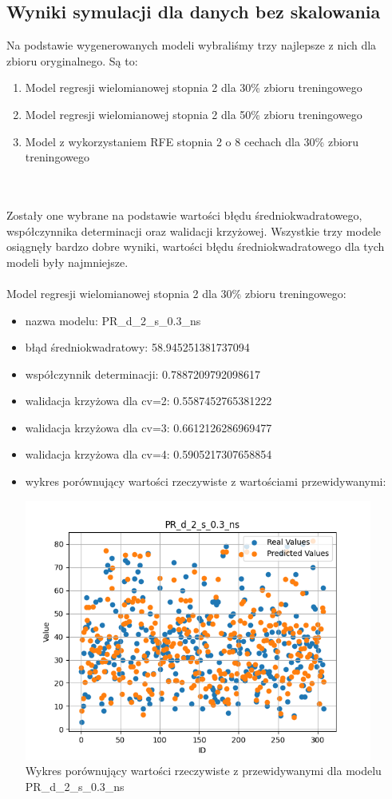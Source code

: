 \documentclass[11pt, a4paper, notitlepage]{report}
\begin{document}
\subsection{Wyniki symulacji dla danych bez skalowania}
Na podstawie wygenerowanych modeli wybraliśmy trzy najlepsze z nich dla zbioru oryginalnego. Są to:
\begin{enumerate}
	\item Model regresji wielomianowej stopnia 2 dla 30\% zbioru treningowego
	\item Model regresji wielomianowej stopnia 2 dla 50\% zbioru treningowego
	\item Model z wykorzystaniem RFE stopnia 2 o 8 cechach dla 30\% zbioru treningowego
\end{enumerate}
\\ \\
Zostały one wybrane na podstawie wartości błędu średniokwadratowego, współczynnika determinacji oraz walidacji krzyżowej. Wszystkie trzy modele osiągnęły bardzo dobre wyniki, wartości błędu średniokwadratowego  dla tych modeli były najmniejsze.
\\ \\
Model regresji wielomianowej stopnia 2 dla 30\% zbioru treningowego:
\begin{itemize}
	\item nazwa modelu: PR\_d\_2\_s\_0.3\_ns
	\item błąd średniokwadratowy: 58.945251381737094
	\item współczynnik determinacji: 0.7887209792098617
	\item walidacja krzyżowa dla cv=2: 0.5587452765381222
	\item walidacja krzyżowa dla cv=3: 0.6612126286969477
	\item walidacja krzyżowa dla cv=4: 0.5905217307658854
	\item wykres porównujący wartości rzeczywiste z wartościami przewidywanymi: \begin{center} \small
		\includegraphics[width=0.9\textwidth]{graphics/plots/PR_d_2_s_0.3_ns.png} \\
		\caption{Wykres porównujący wartości rzeczywiste z przewidywanymi dla modelu PR\_d\_2\_s\_0.3\_ns}
	\end{center}
\end{itemize}
\end{document}
